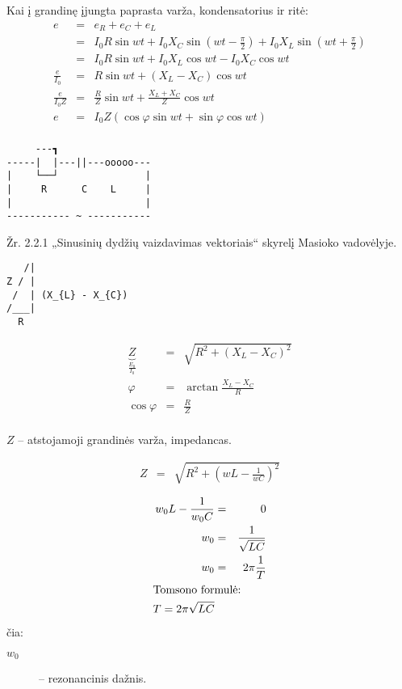 Kai į grandinę įjungta paprasta varža, kondensatorius ir ritė:
\begin{align*}
  e
  &=& e_{R} + e_{C} + e_{L} \\
  &=& I_{0} R \sin wt + I_{0} X_{C} \sin \left( wt - \frac{\pi}{2} \right)
    + I_{0} X_{L} \sin \left(wt + \frac{\pi}{2}\right) \\
  &=& I_{0}R \sin wt + I_{0} X_{L} \cos wt - I_{0} X_{C} \cos wt \\
  \frac{e}{I_{0}} &=& R \sin wt + (X_{L} - X_{C})\cos wt \\
  \frac{e}{I_{0}Z}
  &=& \frac{R}{Z} \sin wt + \frac{X_{L} + X_{C}}{Z} \cos wt \\
  e &=& I_{0} Z
    \left( \cos \varphi \sin wt + \sin \varphi \cos wt \right) \\
\end{align*}
\begin{verbatim}
     ---┓
-----|  |---||---ooooo---
|    └──┘               |
|     R      C    L     |
|                       |
----------- ~ -----------
\end{verbatim}

Žr. 2.2.1 „Sinusinių dydžių vaizdavimas vektoriais“ skyrelį
Masioko vadovėlyje.

\begin{verbatim}
   /|
Z / |
 /  | (X_{L} - X_{C})
/___|
  R
\end{verbatim}

\begin{align*}
  \underbrace{Z}_{\frac{E_{0}}{I_{0}}}
    &=& \sqrt{R^{2} + \left( X_{L} - X_{C} \right)^{2}} \\
  \varphi &=& \arctan \frac{X_{L} - X_{C}}{R} \\
  \cos \varphi &=& \frac{R}{Z} \\
\end{align*}

$Z$ – atstojamoji grandinės varža, impedancas.

\begin{align*}
  Z &=& \sqrt{R^{2} + \left( wL - \frac{1}{wC} \right)^{2}}
\end{align*}

\begin{align*}
  w_{0} L - \frac{1}{w_{0}C} &=& 0 \\
  w_{0} &=& \frac{1}{\sqrt{LC}} \\
  w_{0} &=& 2 \pi \frac{1}{T} \\
  \intertext{Tomsono formulė:}
  T = 2 \pi \sqrt{LC} \\
\end{align*}
čia:
\begin{description}
  \item[$w_{0}$] – rezonancinis dažnis.
\end{description}

